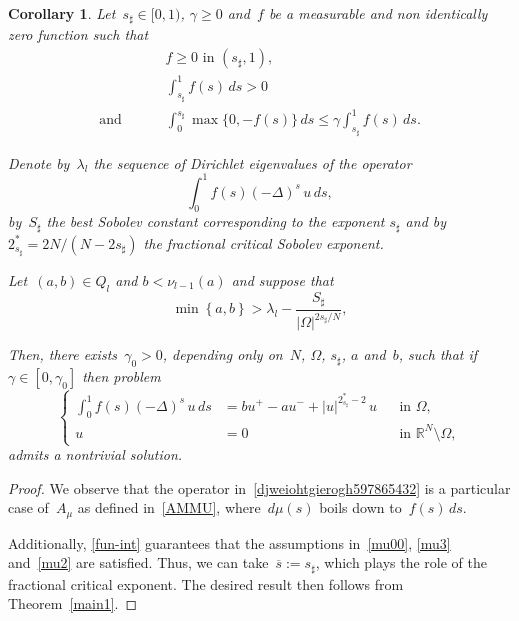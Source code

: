 \documentclass[12pt,a4paper,intlimits,sumlimits]{amsart}
\def \R {\mathbb{R}}
\newcommand{\set}[1]{\left\{#1\right\}}
\theoremstyle{definition}
\theoremstyle{plain}
\newtheorem{corollary}[definition]{Corollary}
\numberwithin{equation}{section}
\renewcommand{\le}{\leqslant}
\renewcommand{\ge}{\geqslant}
\begin{document}
\begin{corollary}\label{function}
Let~$s_\sharp\in [{{ 0 }}, 1)$, $\gamma\ge0$ and~$f$ be a measurable and non identically zero function such that
\begin{equation}\label{fun-int}\begin{split} &
{\mbox{$f\ge 0$ in~$(s_\sharp,1)$,}}\\&
\int_{s_\sharp}^1 f(s) \,ds >0
\\ {\mbox{and }}\qquad&
\int_0^{s_\sharp} \max\{0,-f(s)\} \,ds \le\gamma \int_{s_\sharp}^1 f(s) \,ds .
\end{split}\end{equation}

Denote by~$\lambda_l$ the sequence of Dirichlet eigenvalues of the operator 
\begin{equation}\label{djweiohtgierogh597865432}
\int_0^1 f(s) (-\Delta)^s \, u \, ds ,\end{equation}
 by~$S_\sharp$ the best Sobolev constant corresponding to the exponent $s_\sharp$ and
by~$2_{s_\sharp}^* = 2N/(N-2s_\sharp)$ the fractional critical Sobolev exponent. 

Let~$(a, b)\in Q_l$ and $b <\nu_{l-1}(a)$ and suppose that
\begin{equation*}
\min \set{a,b} > \lambda_l -\frac{S_\sharp}{|\Omega|^{2s_\sharp/N}},
\end{equation*}

Then, there exists~$\gamma_0>0$, depending only on~$N$, $\Omega$, $s_\sharp$, $a$ and~$b$, such that if~$\gamma\in[0,\gamma_0]$
then problem \begin{equation*}
\left\{\begin{aligned}
\int_0^1 f(s) (-\Delta)^s \, u \, ds & = bu^+ - au^- + |u|^{2_{s_\sharp}^* - 2}\, u && \text{in } \Omega,\\
u & = 0 && \text{in } \R^N \setminus \Omega,
\end{aligned}\right.
\end{equation*}
admits a nontrivial solution.\end{corollary}

\begin{proof}
We observe that the operator in~\eqref{djweiohtgierogh597865432}
is a particular case of~$A_\mu$ as defined in~\eqref{AMMU}, where~$d\mu(s)$
boils down to~$f(s)\,ds$.

Additionally, \eqref{fun-int} guarantees that the assumptions
in~\eqref{mu00}, \eqref{mu3} and~\eqref{mu2} are satisfied.
Thus, we can take~$\overline s:=s_\sharp$, which plays the role of the fractional critical exponent. The desired result then follows from Theorem~\ref{main1}.
\end{proof}
\end{document}
